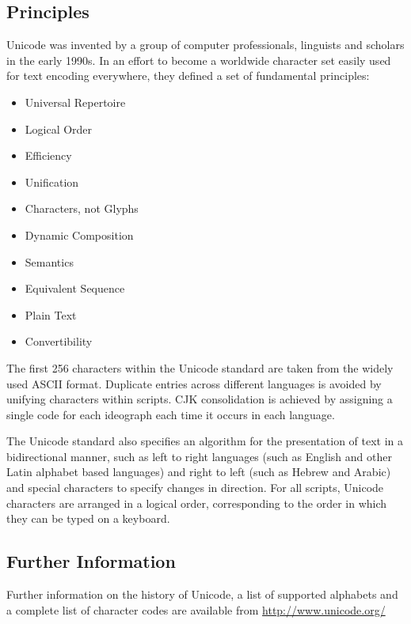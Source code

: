 \subsection{Principles}

Unicode was invented by a group of computer professionals, linguists and
scholars in the early 1990s. In an effort to become a worldwide
character set easily used for text encoding everywhere, they defined a
set of fundamental principles:

\begin{itemize}

\item Universal Repertoire

\item Logical Order

\item Efficiency

\item Unification

\item Characters, not Glyphs

\item Dynamic Composition

\item Semantics

\item Equivalent Sequence

\item Plain Text

\item Convertibility

\end{itemize}

The first 256 characters within the Unicode standard are taken from the
widely used ASCII format. Duplicate entries across different languages
is avoided by unifying characters within scripts. CJK consolidation is
achieved by assigning a single code for each ideograph each time it
occurs in each language.

The Unicode standard also specifies an algorithm for the presentation of
text in a bidirectional manner, such as left to right languages (such as
English and other Latin alphabet based languages) and right to left
(such as Hebrew and Arabic) and special characters to specify changes in
direction. For all scripts, Unicode characters are arranged in a
logical order, corresponding to the order in which they can be typed on
a keyboard.

\subsection{Further Information}

Further information on the history of Unicode, a list of supported
alphabets and a complete list of character codes are available from
\url{http://www.unicode.org/}
